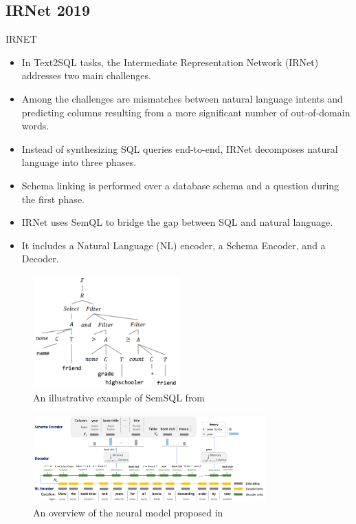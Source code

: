 \subsection{IRNet 2019}
IRNET \cite{DBLP:journals/corr/abs-1905-08205}

\begin{itemize}
    \item In Text2SQL tasks, the Intermediate Representation Network (IRNet) addresses two main challenges.
    \item Among the challenges are mismatches between natural language intents and predicting columns resulting from a more significant number of out-of-domain words.
    \item Instead of synthesizing SQL queries end-to-end, IRNet decomposes natural language into three phases.
    \item Schema linking is performed over a database schema and a question during the first phase.
    \item IRNet uses SemQL to bridge the gap between SQL and natural language.
    \item It includes a Natural Language (NL) encoder, a Schema Encoder, and a Decoder.
\end{itemize}

\begin{figure}[htb]
    \centering
    \includegraphics[width=0.5\textwidth]{pics/IRNet/illustrative_SemSQL}
    \caption{An illustrative example of SemSQL from \cite{DBLP:journals/corr/abs-1905-08205}}
    \label{fig:illustrative_SemSQL}
\end{figure}

\begin{figure}[htb]
    \centering
    \includegraphics[width=0.8\textwidth]{pics/IRNet/overview}
    \caption{An overview of the neural model proposed in \cite{DBLP:journals/corr/abs-1905-08205}}
    \label{fig:overview}
\end{figure}


